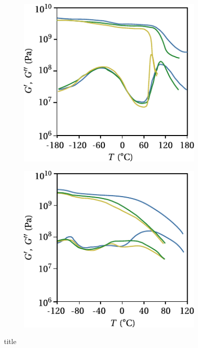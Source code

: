 \begin{figure}[htbp]
\centering
\begin{subfigure}[b]{0.45\textwidth}
\centering
\includegraphics[width=\textwidth]{figures/pet_dma}
\caption{}
\label{subfig:pet_dma}
\end{subfigure} \hfill
	\begin{subfigure}[b]{0.45\textwidth}
		\centering
						\includegraphics[width=\textwidth]{figures/pe_dma}
						\caption{}
						\label{subfig:pe_dma}
		\end{subfigure}
	\caption{title}
\end{figure}

